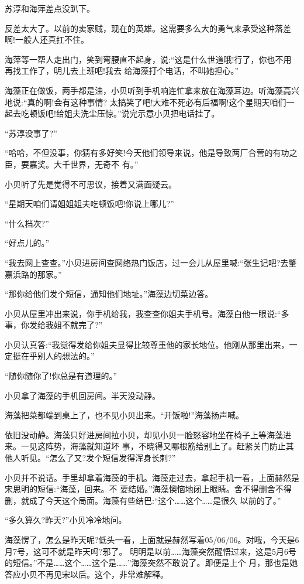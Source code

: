 \documentclass[11pt,a4paper,onecolumn]{article}
\begin{document}
苏淳和海萍差点没趴下。

反差太大了。以前的卖家贼，现在的英雄。这需要多么大的勇气来承受这种落差啊!一般人还真扛不住。

海萍等一帮人走出门，笑到弯腰直不起身，说:``这是什么世道哦!行了，你也不用再找工作了，明儿去上班吧!我去
给海藻打个电话，不叫她担心。''

海藻正在做饭，两手都是油，小贝听到手机响连忙拿来放在海藻耳边。听海藻高兴地说:``真的啊!会有这种事情?
太搞笑了吧!大难不死必有后福啊!这个星期天咱们一起去吃顿饭吧!给姐夫洗尘压惊。''说完示意小贝把电话挂了。

``苏淳没事了?''

``哈哈，不但没事，你猜有多好笑!今天他们领导来说，他是导致两厂合营的有功之臣，要嘉奖。大千世界，无奇不
有。''

小贝听了先是觉得不可思议，接着又满面疑云。

``星期天咱们请姐姐姐夫吃顿饭吧!你说上哪儿?''

``什么档次?''

``好点儿的。''

``我去网上查查。''小贝进房间查网络热门饭店，过一会儿从屋里喊:``张生记吧?去肇嘉浜路的那家。''

``那你给他们发个短信，通知他们地址。''海藻边切菜边答。

小贝从屋里冲出来说，你手机给我，我查查你姐夫手机号。海藻白他一眼说:``多事，你发给我姐不就完了?''

小贝认真答:``我觉得发给你姐夫显得比较尊重他的家长地位。他刚从那里出来，一定挺在乎别人的想法的。''

``随你随你了!你总是有道理的。''

小贝拿了海藻的手机回房间。半天没动静。

海藻把菜都端到桌上了，也不见小贝出来。``开饭啦!''海藻扬声喊。

依旧没动静。海藻只好进房间拉小贝，却见小贝一脸怒容地坐在椅子上等海藻进来。一见这阵势，海藻就知道坏
事，不晓得又哪根筋给别上了。赶紧关门防止其他人听见。``怎么了又?发个短信发得浑身长刺?''

小贝并不说话。手里却拿着海藻的手机。海藻走过去，拿起手机一看，上面赫然是宋思明的短信:``海藻，回来。不
要结婚。''海藻懊恼地闭上眼睛。舍不得删舍不得删，就成了今天这个局面。海藻有些结巴:``这个……这个……是很久
以前的了。''

``多久算久?昨天?''小贝冷冷地问。

海藻愣了，怎么是昨天呢?低头一看，上面就是赫然写着05/06/06。对哦，今天是6月7号，这可不就是昨天吗?邪了。
明明是以前……海藻突然醒悟过来，这是5月6号的短信。''不是……这个……这个是……''海藻突然不敢说了。即便是上个
月，那也是她答应小贝不再见宋以后。这个，非常难解释。
\end{document}
